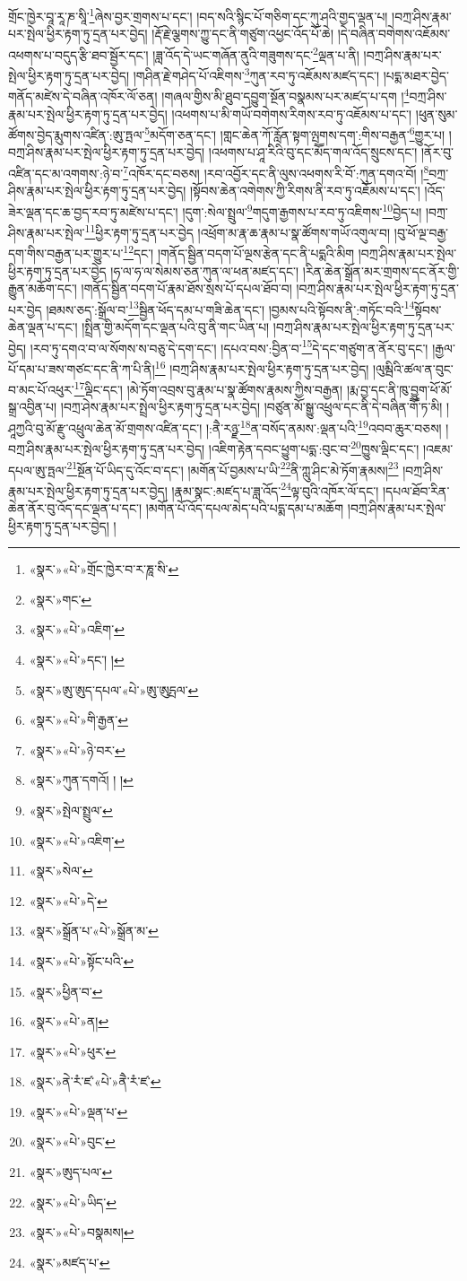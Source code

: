 གྲོང་ཁྱེར་བཱ་རཱ་ཎ་སཱི་\footnote{«སྣར་»«པེ་»གྲོང་ཁྱེར་བ་ར་ཎཱ་སི་}ཞེས་བྱར་གྲགས་པ་དང་། །བད་སའི་སྙིང་པོ་གཅིག་དང་ཀུ་ཤའི་གྱད་ལྡན་པ། །བཀྲ་ཤིས་རྣམ་པར་སྤེལ་ཕྱིར་རྟག་ཏུ་དྲན་པར་བྱེད། །རྡོ་རྗེ་ལྕགས་ཀྱུ་དང་ནི་གཙུག་འཕྱང་འོད་པོ་ཆེ། །དེ་བཞིན་བགེགས་འཇོམས་འཕགས་པ་བདུད་རྩི་ཐབ་སྦྱོར་དང་། །ཟླ་འོད་དེ་ཡང་གཞོན་ནུའི་གཟུགས་དང་\footnote{«སྣར་»གང་}ལྡན་པ་ནི། །བཀྲ་ཤིས་རྣམ་པར་སྤེལ་ཕྱིར་རྟག་ཏུ་དྲན་པར་བྱེད། །གཤིན་རྗེ་གཤེད་པོ་འཇིགས་\footnote{«སྣར་»«པེ་»འཇིག་}ཀུན་རབ་ཏུ་འཇོམས་མཛད་དང་། །པདྨ་མཐར་བྱེད་གནོད་མཛེས་དེ་བཞིན་འཁོར་ལོ་ཅན། །གཞལ་གྱིས་མི་ཐུབ་དབྱུག་སྔོན་བསྣམས་པར་མཛད་པ་དག །\footnote{«སྣར་»«པེ་»དང་། །}བཀྲ་ཤིས་རྣམ་པར་སྤེལ་ཕྱིར་རྟག་ཏུ་དྲན་པར་བྱེད། །འཕགས་པ་མི་གཡོ་བགེགས་རིགས་རབ་ཏུ་འཇོམས་པ་དང་། །ཕུན་སུམ་ཚོགས་བྱེད་རྨུགས་འཛིན་:ཨུ་ཏྤལ་\footnote{«སྣར་»ཨུ་ཨུད་དཔལ་«པེ་»ཨུ་ཨུདྤལ་}མདོག་ཅན་དང་། །གླང་ཆེན་ཀོ་རློན་སྟག་ལྤགས་དག་:གིས་བརྒྱན་\footnote{«སྣར་»«པེ་»གི་རྒྱན་}གྱུར་པ། །བཀྲ་ཤིས་རྣམ་པར་སྤེལ་ཕྱིར་རྟག་ཏུ་དྲན་པར་བྱེད། །འཕགས་པ་ཤཱ་རིའི་བུ་དང་མཽད་གལ་འོད་སྲུངས་དང་། །ནོར་བུ་འཛིན་དང་མ་འགགས་:ཉེ་བ་\footnote{«སྣར་»«པེ་»ཉེ་བར་}འཁོར་དང་བཅས། །རབ་འབྱོར་དང་ནི་ལུས་འཕགས་རི་བོ་:ཀུན་དགའ་བོ། །\footnote{«སྣར་»ཀུན་དགའོ། ། །}བཀྲ་ཤིས་རྣམ་པར་སྤེལ་ཕྱིར་རྟག་ཏུ་དྲན་པར་བྱེད། །སྟོབས་ཆེན་འགེགས་ཀྱི་རིགས་ནི་རབ་ཏུ་འཇོམས་པ་དང་། །འོད་ཟེར་ལྡན་དང་ཆ་བྱད་རབ་ཏུ་མཛེས་པ་དང་། །དུག་:སེལ་སྤྲུལ་\footnote{«སྣར་»སྤེལ་སྤྲུལ་}གདུག་རྒྱགས་པ་རབ་ཏུ་འཇིགས་\footnote{«སྣར་»«པེ་»འཇིག་}བྱེད་པ། །བཀྲ་ཤིས་རྣམ་པར་སྤེལ་\footnote{«སྣར་»སེལ་}ཕྱིར་རྟག་ཏུ་དྲན་པར་བྱེད །འཕྲོག་མ་རྣ་ཆ་རྣམ་པ་སྣ་ཚོགས་གཡོ་འགུལ་བ། །བུ་ཕོ་ལྔ་བརྒྱ་དག་གིས་བརྒྱན་པར་གྱུར་པ་\footnote{«སྣར་»«པེ་»དེ་}དང་། །གནོད་སྦྱིན་བདག་པོ་ལྔས་རྩེན་དང་ནི་པདྨའི་མིག །བཀྲ་ཤིས་རྣམ་པར་སྤེལ་ཕྱིར་རྟག་ཏུ་དྲན་པར་བྱེད །ཧ་ལ་ཧ་ལ་སེམས་ཅན་ཀུན་ལ་ཕན་མཛད་དང་། །རིན་ཆེན་སྒྲོན་མར་གྲགས་དང་ནོར་གྱི་རྒྱུན་མཆོག་དང་། །གནོད་སྦྱིན་བདག་པོ་རྣམ་ཐོས་སྲས་པོ་དཔལ་ཐོབ་བ། །བཀྲ་ཤིས་རྣམ་པར་སྤེལ་ཕྱིར་རྟག་ཏུ་དྲན་པར་བྱེད །ཐམས་ཅད་:སྒྲོལ་བ་\footnote{«སྣར་»སྒྲོན་པ་«པེ་»སྒྲོན་མ་}སྦྱིན་ཕོད་དམ་པ་གཟི་ཆེན་དང་། །བྱམས་པའི་སྟོབས་ནི་:གཏོང་བའི་\footnote{«སྣར་»«པེ་»སྟོང་པའི་}སྟོབས་ཆེན་ལྡན་པ་དང་། །སྤྲིན་གྱི་མདོག་དང་ལྡན་པའི་བུ་ནི་གང་ཡིན་པ། །བཀྲ་ཤིས་རྣམ་པར་སྤེལ་ཕྱིར་རྟག་ཏུ་དྲན་པར་བྱེད། །རབ་ཏུ་དགའ་བ་ལ་སོགས་ས་བཅུ་དེ་དག་དང་། །དཔའ་བས་:བྱིན་བ་\footnote{«སྣར་»ཕྱིན་བ་}དེ་དང་གཙུག་ན་ནོར་བུ་དང་། །རྒྱལ་པོ་དམ་པ་ཟས་གཙང་དང་ནི་ཀ་པི་ནི།\footnote{«སྣར་»«པེ་»ན།} །བཀྲ་ཤིས་རྣམ་པར་སྤེལ་ཕྱིར་རྟག་ཏུ་དྲན་པར་བྱེད། །ལུམྦིའི་ཚལ་ན་བུང་བ་མང་པོ་འཕུར་\footnote{«སྣར་»«པེ་»ཕུར་}ལྡིང་དང་། །མེ་ཏོག་འབྲས་བུ་རྣམ་པ་སྣ་ཚོགས་རྣམས་ཀྱིས་བརྒྱན། །རྨ་བྱ་དང་ནི་ཁུ་བྱུག་ཕོ་མོ་སྒྲ་འབྱིན་པ། །བཀྲ་ཤེས་རྣམ་པར་སྤྲེལ་ཕྱིར་རྟག་ཏུ་དྲན་པར་བྱེད། །བཙུན་མོ་སྒྱུ་འཕྲུལ་དང་ནི་དེ་བཞིན་གཽ་ཏ་མི། །ཤཱཀྱའི་བུ་མོ་རྫུ་འཕྲུལ་ཆེན་མོ་གྲགས་འཛིན་དང་། །:ནཻ་རཉྫ་\footnote{«སྣར་»ནེ་རཾ་ཛ་«པེ་»ནཻ་རཾ་ཛ་}ན་བསོད་ནམས་:ལྡན་པའི་\footnote{«སྣར་»«པེ་»ལྡན་པ་}འབབ་ཆུར་བཅས། །བཀྲ་ཤིས་རྣམ་པར་སྤེལ་ཕྱིར་རྟག་ཏུ་དྲན་པར་བྱེད། །འཇིག་རྟེན་དབང་ཕྱུག་པདྨ་:བུང་བ་\footnote{«སྣར་»«པེ་»བུང་}ཁྱུས་ལྡིང་དང་། །འཇམ་དཔལ་ཨུ་ཏྤལ་\footnote{«སྣར་»ཨུད་པལ་}སྔོན་པོ་ཡིད་དུ་འོང་བ་དང་། །མགོན་པོ་བྱམས་པ་ཡི་\footnote{«སྣར་»«པེ་»ཡིད་}ནི་ཀླུ་ཤིང་མེ་ཏོག་རྣམས།\footnote{«སྣར་»«པེ་»བསྣམས།} །བཀྲ་ཤིས་རྣམ་པར་སྤེལ་ཕྱིར་རྟག་ཏུ་དྲན་པར་བྱེད། །རྣམ་སྣང་:མཛད་པ་ཟླ་འོད་\footnote{«སྣར་»མཛད་པ་}ལྟ་བུའི་འཁོར་ལོ་དང་། །དཔལ་ཐོབ་རིན་ཆེན་ནོར་བུ་འོད་དང་ལྡན་པ་དང་། །མགོན་པོ་འོད་དཔལ་མེད་པའི་པདྨ་དམ་པ་མཆོག །བཀྲ་ཤིས་རྣམ་པར་སྤེལ་ཕྱིར་རྟག་ཏུ་དྲན་པར་བྱེད། །

